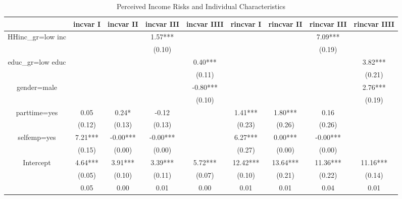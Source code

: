 
\begin{table}[p]
\centering
\begin{adjustbox}{width={0.9\textwidth}}
\begin{threeparttable}
\caption{Perceived Income Risks and Individual Characteristics}
\label{micro_reg}\begin{tabular}{ccccccccc}
\toprule
{} & incvar I & incvar II & incvar III & incvar IIII & rincvar I & rincvar II & rincvar III & rincvar IIII \\
\midrule
HHinc\_gr=low inc &          &           &    1.57*** &             &           &            &     7.09*** &              \\
                 &          &           &     (0.10) &             &           &            &      (0.19) &              \\
educ\_gr=low educ &          &           &            &     0.40*** &           &            &             &      3.82*** \\
                 &          &           &            &      (0.11) &           &            &             &       (0.21) \\
gender=male      &          &           &            &    -0.80*** &           &            &             &      2.76*** \\
                 &          &           &            &      (0.10) &           &            &             &       (0.19) \\
parttime=yes     &     0.05 &     0.24* &      -0.12 &             &   1.41*** &    1.80*** &        0.16 &              \\
                 &   (0.12) &    (0.13) &     (0.13) &             &    (0.23) &     (0.26) &      (0.26) &              \\
selfemp=yes      &  7.21*** &  -0.00*** &   -0.00*** &             &   6.27*** &    0.00*** &    -0.00*** &              \\
                 &   (0.15) &    (0.00) &     (0.00) &             &    (0.27) &     (0.00) &      (0.00) &              \\
Intercept        &  4.64*** &   3.91*** &    3.39*** &     5.72*** &  12.42*** &   13.64*** &    11.36*** &     11.16*** \\
                 &   (0.05) &    (0.10) &     (0.11) &      (0.07) &    (0.10) &     (0.21) &      (0.22) &       (0.14) \\
                 &     0.05 &      0.00 &       0.01 &        0.00 &      0.01 &       0.01 &        0.04 &         0.01 \\

\end{tabular}
\end{threeparttable}
\end{adjustbox}
\end{table}
